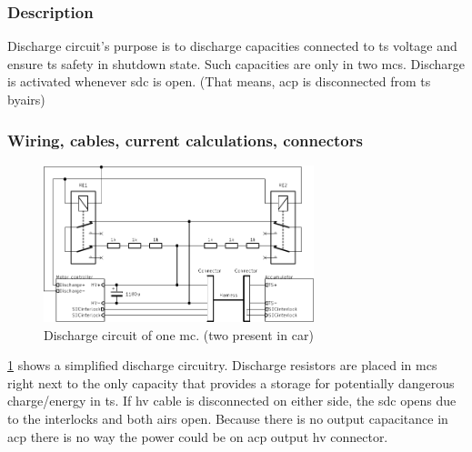 \subsubsection{Description}

Discharge circuit's purpose is to discharge capacities connected to \gls{ts} voltage and ensure \gls{ts} safety in shutdown state. Such capacities are only in two \glspl{mc}.
Discharge is activated whenever \gls{sdc} is open. (That means, \gls{acp} is disconnected from \gls{ts} by\glspl{air})

\subsubsection{Wiring, cables, current calculations, connectors}

\begin{figure}[H]
	\centering
	\includegraphics[width=0.7\textwidth]{./img/MC_discharge.pdf}
	\caption{Discharge circuit of one \gls{mc}. (two present in car)}
	\label{fig:discharge-circuit}
\end{figure}

\ref{fig:discharge-circuit} shows a simplified discharge circuitry. Discharge resistors are placed in \glspl{mc} right next to the only capacity that provides a storage for potentially dangerous charge/energy in \gls{ts}. If \gls{hv} cable is disconnected on either side, the \gls{sdc} opens due to the interlocks and both \glspl{air} open. Because there is no output capacitance in \gls{acp} there is no way the power could be on \gls{acp} output \gls{hv} connector.

